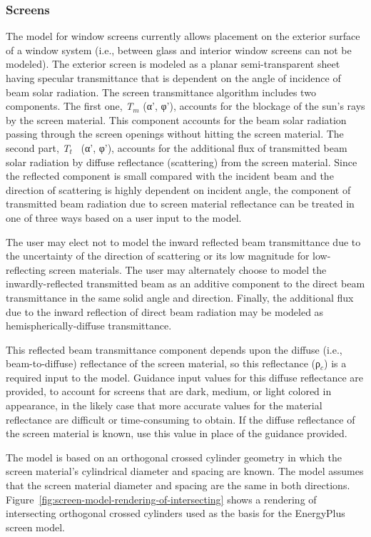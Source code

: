 \subsubsection{Screens}\label{screens}

The model for window screens currently allows placement on the exterior surface of a window system (i.e., between glass and interior window screens can not be modeled). The exterior screen is modeled as a planar semi-transparent sheet having specular transmittance that is dependent on the angle of incidence of beam solar radiation. The screen transmittance algorithm includes two components. The first one, \emph{T\(_{m}\)} (α', φ'), accounts for the blockage of the sun's rays by the screen material. This component accounts for the beam solar radiation passing through the screen openings without hitting the screen material. The second part, \emph{T\(_{t}\)}~ (α', φ'), accounts for the additional flux of transmitted beam solar radiation by diffuse reflectance (scattering) from the screen material. Since the reflected component is small compared with the incident beam and the direction of scattering is highly dependent on incident angle, the component of transmitted beam radiation due to screen material reflectance can be treated in one of three ways based on a user input to the model.

The user may elect not to model the inward reflected beam transmittance due to the uncertainty of the direction of scattering or its low magnitude for low-reflecting screen materials. The user may alternately choose to model the inwardly-reflected transmitted beam as an additive component to the direct beam transmittance in the same solid angle and direction. Finally, the additional flux due to the inward reflection of direct beam radiation may be modeled as hemispherically-diffuse transmittance.

This reflected beam transmittance component depends upon the diffuse (i.e., beam-to-diffuse) reflectance of the screen material, so this reflectance (ρ\(_{c}\)) is a required input to the model. Guidance input values for this diffuse reflectance are provided, to account for screens that are dark, medium, or light colored in appearance, in the likely case that more accurate values for the material reflectance are difficult or time-consuming to obtain. If the diffuse reflectance of the screen material is known, use this value in place of the guidance provided.

The model is based on an orthogonal crossed cylinder geometry in which the screen material's cylindrical diameter and spacing are known. The model assumes that the screen material diameter and spacing are the same in both directions. Figure~\ref{fig:screen-model-rendering-of-intersecting} shows a rendering of intersecting orthogonal crossed cylinders used as the basis for the EnergyPlus screen model.

